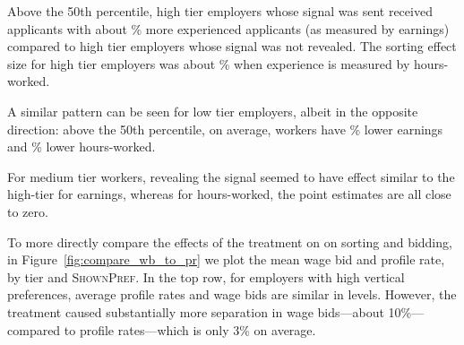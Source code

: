 



Above the 50th percentile,  high tier employers whose signal was sent received applicants with about \EffectEarningsExperiencetHighTier{}\% more experienced applicants (as measured by earnings) compared to high tier employers whose signal was not revealed.
The sorting effect size for high tier employers was about \EffectHoursExperiencetHighTier{}\% when experience is measured by hours-worked.  

A similar pattern can be seen for low tier employers, albeit in the opposite direction:
above the 50th percentile, on average, workers have \EffectEarningsExperiencetLowTier{}\% lower earnings and \EffectHoursExperiencetLowTier{}\% lower hours-worked. 

For medium tier workers, revealing the signal seemed to have effect similar to the high-tier for earnings, whereas for hours-worked, the point estimates are all close to zero.


To more directly compare the effects of the treatment on on sorting and bidding, in Figure~\ref{fig:compare_wb_to_pr} we plot the mean wage bid and profile rate, by tier and \textsc{ShownPref}.
In the top row, for employers with high vertical preferences, average profile rates and wage bids are similar in levels.
However, the treatment caused substantially more separation in wage bids---about 10\%---compared to profile rates---which is only 3\% on average.

